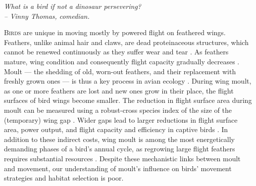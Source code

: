 


\begin{center}
    \emph{What is a bird if not a dinosaur persevering?\\
    \medskip
    -- \small{Vinny Thomas, comedian.}}
\end{center}

\medskip

\lettrine{B}{irds} are unique in moving mostly by powered flight on feathered wings.
Feathers, unlike animal hair and claws, are dead proteinaceous structures, which cannot be renewed continuously as they suffer wear and tear \parencite{rayner1988,jenni1989}.
As feathers mature, wing condition and consequently flight capacity gradually decreases \parencite{lindstrom1994,hedenstrom1999,hedenstrom2003}.
Moult --- the shedding of old, worn-out feathers, and their replacement with freshly grown ones --- is thus a key process in avian ecology \parencite{ginn1983,rayner1988}.
During wing moult, as one or more feathers are lost and new ones grow in their place, the flight surfaces of bird wings become smaller.
The reduction in flight surface area during moult can be measured using a robust-cross species index of the size of the (temporary) wing gap \citep{lind2001,kiat2016}.
Wider gaps lead to larger reductions in flight surface area, power output, and flight capacity and efficiency in captive birds \parencite{tucker1991,swaddle1996,swaddle1997,williams2003,lind2001,lind2001a,bowlin2009}.
In addition to these indirect costs, wing moult is among the most energetically demanding phases of a bird's annual cycle, as regrowing large flight feathers requires substantial resources \parencite{lindstrom1993,newton2009,kiat2017}.
Despite these mechanistic links between moult and movement, our understanding of moult's influence on birds' movement strategies and habitat selection is poor.

